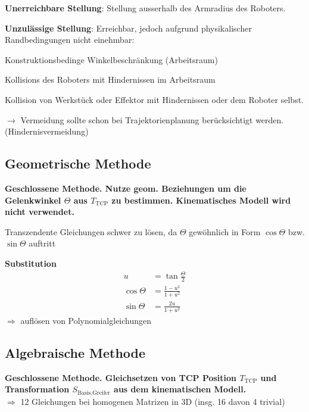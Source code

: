 \begin{compactitem}
    \item \textbf{Unerreichbare Stellung}: Stellung ausserhalb des Armradius des Roboters.
    \item \textbf{Unzulässige Stellung}: Erreichbar, jedoch aufgrund physikalischer Randbedingungen
    nicht einehmbar:
    \begin{compactitem}
        \item Konstruktionsbedinge Winkelbeschränkung (Arbeitsraum)
        \item Kollisions des Roboters mit Hindernissen im Arbeitsraum
        \item Kollision von Werkstück oder Effektor mit Hindernissen oder dem Roboter selbst.
    \end{compactitem}
    \item $\rightarrow$ Vermeidung sollte schon bei Trajektorienplanung berücksichtigt werden.
    (Hindernisvermeidung)
\end{compactitem}

\subsection{Geometrische Methode}
\textbf{Geschlossene Methode. Nutze geom. Beziehungen um die Gelenkwinkel $\Theta$ aus $T_{\text{TCP}}$
zu bestimmen. Kinematisches Modell wird nicht verwendet.}

Transzendente Gleichungen schwer zu lösen, da $\Theta$ gewöhnlich in Form $\cos\Theta$ bzw.
$\sin\Theta$ auftritt

\textbf{Substitution}
\begin{align}
    u &= \tan\frac{\Theta}{2} \\
    \cos\Theta &= \frac{1-u^2}{1+u^2}\\
    \sin\Theta &= \frac{2u}{1+u^2}
\end{align}
$\Rightarrow$ auflösen von Polynomialgleichungen

\subsection{Algebraische Methode}
\textbf{Geschlossene Methode. Gleichsetzen von TCP Position $T_{\text{TCP}}$ und Transformation
$S_{\text{Basis,Greifer}}$ aus dem kinematischen Modell.} \\
$\Rightarrow$ 12 Gleichungen bei homogenen Matrizen in 3D (insg. 16 davon 4 trivial)

